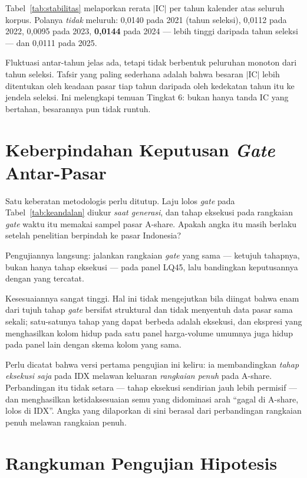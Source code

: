 \documentclass{laporanta1statugm}
\begin{document}
Tabel~\ref{tab:stabilitas} melaporkan rerata $\lvert\mathrm{IC}\rvert$ per
tahun kalender atas seluruh korpus. Polanya \emph{tidak} meluruh:
0,0140 pada 2021 (tahun seleksi), 0,0112 pada 2022, 0,0095 pada 2023,
\textbf{0,0144} pada 2024 --- lebih tinggi daripada tahun seleksi --- dan
0,0111 pada 2025.

Fluktuasi antar-tahun jelas ada, tetapi tidak berbentuk peluruhan monoton dari
tahun seleksi. Tafsir yang paling sederhana adalah bahwa besaran
$\lvert\mathrm{IC}\rvert$ lebih ditentukan oleh keadaan pasar tiap tahun
daripada oleh kedekatan tahun itu ke jendela seleksi. Ini melengkapi temuan
Tingkat 6: bukan hanya tanda IC yang bertahan, besarannya pun tidak runtuh.

\section{Keberpindahan Keputusan \textit{Gate} Antar-Pasar}

Satu keberatan metodologis perlu ditutup. Laju lolos \textit{gate} pada
Tabel~\ref{tab:keandalan} diukur \emph{saat generasi}, dan tahap eksekusi pada
rangkaian \textit{gate} waktu itu memakai sampel pasar A-share. Apakah angka
itu masih berlaku setelah penelitian berpindah ke pasar Indonesia?

Pengujiannya langsung: jalankan rangkaian \textit{gate} yang sama --- ketujuh
tahapnya, bukan hanya tahap eksekusi --- pada panel LQ45, lalu bandingkan
keputusannya dengan yang tercatat.



Kesesuaiannya sangat tinggi. Hal ini tidak mengejutkan bila diingat bahwa enam
dari tujuh tahap \textit{gate} bersifat struktural dan tidak menyentuh data
pasar sama sekali; satu-satunya tahap yang dapat berbeda adalah eksekusi, dan
ekspresi yang menghasilkan kolom hidup pada satu panel harga-volume umumnya
juga hidup pada panel lain dengan skema kolom yang sama.

Perlu dicatat bahwa versi pertama pengujian ini keliru: ia membandingkan
\emph{tahap eksekusi saja} pada IDX melawan keluaran \emph{rangkaian penuh}
pada A-share. Perbandingan itu tidak setara --- tahap eksekusi sendirian jauh
lebih permisif --- dan menghasilkan ketidaksesuaian semu yang didominasi arah
``gagal di A-share, lolos di IDX''. Angka yang dilaporkan di sini berasal dari
perbandingan rangkaian penuh melawan rangkaian penuh.

\section{Rangkuman Pengujian Hipotesis}
\end{document}
